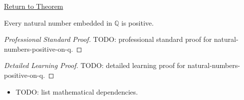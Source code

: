 \newpage
{}
\label{prf:natural-numbers-positive-on-q}

\begin{remark*}[Return]
\hyperref[cor:natural-numbers-positive-on-q]{Return to Theorem}
\end{remark*}

\begin{corollary*}
Every natural number embedded in $\mathbb{Q}$ is positive.
\end{corollary*}

\begin{proof}[Professional Standard Proof]
\LRAProofBodyStart
TODO: professional standard proof for natural-numbers-positive-on-q.
\end{proof}

\begin{proof}[Detailed Learning Proof]
\LRAProofBodyStart
TODO: detailed learning proof for natural-numbers-positive-on-q.
\end{proof}

\begin{remark*}
\end{remark*}

\begin{dependencies}
\begin{itemize}
  \item TODO: list mathematical dependencies.
\end{itemize}
\end{dependencies}

\clearpage

